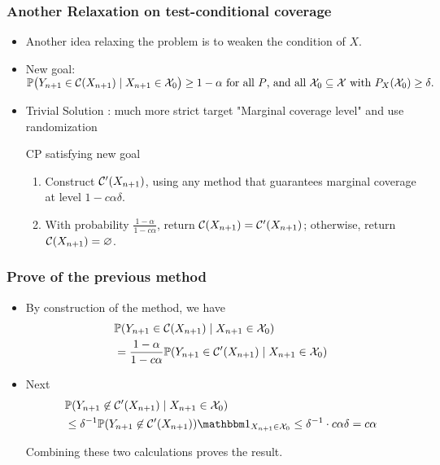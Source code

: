 \documentclass[compress]{beamer}
\begin{document}
\begin{frame}\frametitle{Another Relaxation on test-conditional coverage}
	\begin{itemize}
		\item Another idea relaxing the problem is to weaken the condition of $X$.
		\item New goal:
		$\label{eqn:test_conditional_relax_alpha_delta}\mathbb{P}\big(Y_{n+1}\in\mathcal{C}(X_{n+1})\mid X_{n+1}\in\mathcal{X}_0\big)\geq 1-\alpha\textnormal{ for all $P$, and all $\mathcal{X}_0\subseteq\mathcal{X}$ with $P_X(\mathcal{X}_0)\geq \delta$}.$
		\item Trivial Solution : much more strict target "Marginal coverage level" and use randomization
		\begin{alertblock}{CP satisfying new goal}
			\begin{enumerate}
				\item Construct $\mathcal{C}'(X_{n+1})$, using any method that guarantees marginal coverage at level $1-c\alpha\delta$.
				\item With probability $\frac{1-\alpha}{1-c\alpha}$, return $\mathcal{C}(X_{n+1}) = \mathcal{C}'(X_{n+1})$; otherwise, return $\mathcal{C}(X_{n+1}) = \varnothing$.
			\end{enumerate}
		\end{alertblock}
	\end{itemize}
\end{frame}

\begin{frame}\frametitle{Prove of the previous method}
	\begin{itemize}
		\item By construction of the method, we have
		\begin{align*}
			&\mathbb{P}(Y_{n+1}\in\mathcal{C}(X_{n+1})\mid X_{n+1}\in \mathcal{X}_0) \\
			&=\frac{1-\alpha}{1-c\alpha} \mathbb{P}(Y_{n+1}\in\mathcal{C}'(X_{n+1})\mid X_{n+1}\in \mathcal{X}_0)
		\end{align*}
		\item Next
		\begin{align*}
			&\P(Y_{n+1}\not\in\cC'(X_{n+1})\mid X_{n+1}\in\cX_0) \\ &\le \delta^{-1} \P(Y_{n+1}\not\in\cC'(X_{n+1}))\indsub{X_{n+1}\in \cX_0} \le
			\delta^{-1} \cdot c\alpha \delta = c\alpha
		\end{align*}
		
		Combining these two calculations proves the result.
	\end{itemize}
\end{frame}
\end{document}
